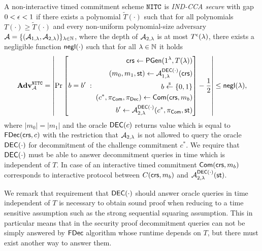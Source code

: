 \begin{definition}
\label{def:nitc_cca}
A non-interactive timed commitment scheme $\mathtt{NITC}$ is \emph{IND-CCA secure} with gap $0 < \epsilon < 1$ if there exists a polynomial $\tilde{T}(\cdot)$ such that for all polynomials $T(\cdot) \geq \tilde{T}(\cdot)$ and every non-uniform polynomial-size adversary $\mathcal{A} = \{(\mathcal{A}_{1,\lambda}, \mathcal{A}_{2, \lambda})\}_{\lambda \in \mathbb{N}}$, where the depth of $\mathcal{A}_{2, \lambda}$ is at most $T^{\epsilon}(\lambda)$, there exists a negligible function $\mathsf{negl}(\cdot)$ such that for all $\lambda \in \mathbb{N}$ it holds 
\[ \mathbf{Adv}^{\mathtt{NITC}}_{\mathcal{A}} = 
\left| \Pr\left[ 
    b = b'
    \;:\;
    \begin{aligned}
    \mathsf{crs} \leftarrow \mathsf{PGen}(1{^{\lambda}}, T(\lambda)) \\
      (m_0, m_1, \mathsf{st}) \leftarrow \mathcal{A}_{1,\lambda}^{\mathsf{DEC}(\cdot)}(\mathsf{crs}) \\
      b \stackrel{{\scriptscriptstyle\$}}{\leftarrow} \{0,1\}\\
      (c^*, \pi_{\mathsf{Com}}, \pi_{\mathsf{Dec}}) \leftarrow \mathsf{Com}(\mathsf{crs}, m_b) \\
      b' \leftarrow \mathcal{A}_{2,\lambda}^{\mathsf{DEC}(\cdot)}(c^*, \pi_{\mathsf{Com}}, \mathsf{st})
    \end{aligned}
    \right] -  \frac{1}{2} \right|
\leq \mathsf{negl}(\lambda),  
\]
where $|m_0|=|m_1|$ and the oracle ${\mathsf{DEC}(c)}$ returns value which is equal to $\mathsf{FDec}(\mathsf{crs}, c)$ with the restriction that $\mathcal{A}_{2, \lambda}$ is not allowed to query the oracle $\mathsf{DEC}(\cdot)$ for decommitment of the challenge commitment $c^*$. We require that $\mathsf{DEC}(\cdot)$ must be able to answer decommitment queries in time which is independent of $T$. In case of an interactive timed commitment $\mathsf{Com}(\mathsf{crs}, m_b)$ corresponds to interactive protocol between $C(\mathsf{crs}, m_b)$ and $\mathcal{A}_{2,\lambda}^{\mathsf{DEC}(\cdot)}(\mathsf{st})$.
\end{definition}

We remark that requirement that $\mathsf{DEC}(\cdot)$ should answer oracle queries in time independent of $T$ is necessary to obtain sound proof when reducing to a time sensitive assumption such as the strong sequential squaring assumption. This in particular means that in the security proof decommitment queries can not be simply answered by $\mathsf{FDec}$ algorithm whose runtime depends on $T$, but there must exist another way to answer them. 


